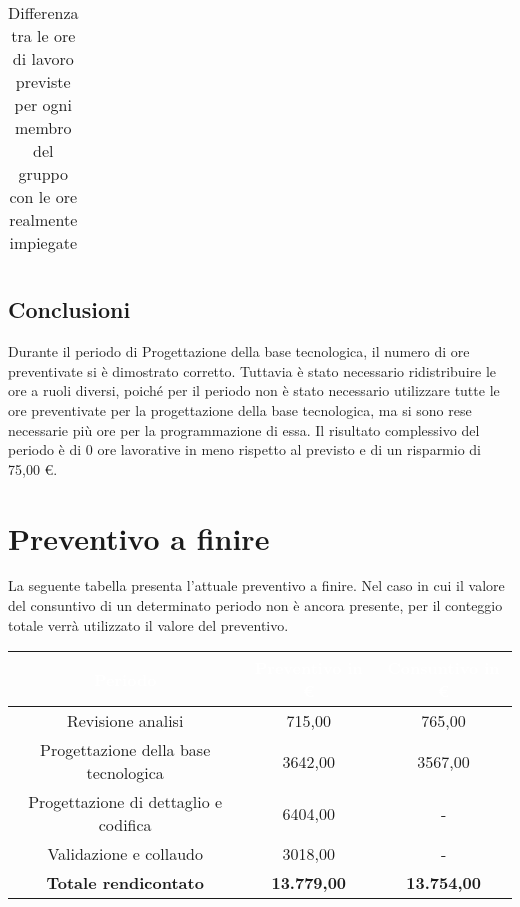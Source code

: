 \begin{flushleft}
\begin{table}[H]
\begin{center}
\begin{tabularx}{\textwidth}{|c|cccccc|c|}
   	\end{tabularx}
  	\caption{Differenza tra le ore di lavoro previste per ogni membro del gruppo con le ore realmente impiegate }
\end{center}
\end{table}
  
  \subsection{Conclusioni}
  Durante il periodo di Progettazione della base tecnologica, il numero di ore preventivate si è dimostrato corretto. Tuttavia è stato necessario ridistribuire le ore a ruoli diversi, poiché per il periodo non è stato necessario utilizzare tutte le ore preventivate per la progettazione della base tecnologica, ma si sono rese necessarie più ore per la programmazione di essa. 
  Il risultato complessivo del periodo è di 0 ore lavorative in meno rispetto al previsto e di un risparmio di 75,00 \euro.
  
  \newpage

  \section{Preventivo a finire}
  La seguente tabella presenta l'attuale preventivo a finire. Nel caso in cui il valore del consuntivo di un determinato periodo non è ancora presente, per il conteggio totale verrà utilizzato il valore del preventivo.
  

  
	\begin{table}[H]
  
	\begin{center}
  
  
		\begin{tabular}{ccc}
  
			\rowcolor{coolblack}
  
			\hline
  
			\textcolor{white}{Periodo} & \textcolor{white}{Preventivo in \euro} & \textcolor{white}{Consuntivo in \euro}\\
  
			\hline
			Revisione analisi   & 715,00	&  765,00  			 	\\ 
			Progettazione della base tecnologica &  3642,00 &  3567,00 \\ 
			Progettazione di dettaglio e codifica    & 6404,00  &  -	\\ 
			Validazione e collaudo    & 3018,00 & - 	\\ \hline
			\textbf{Totale rendicontato}& \textbf{13.779,00} & \textbf{13.754,00}	\\ \hline   
  

\end{tabular}
\end{center}
\end{table}
\end{flushleft}
